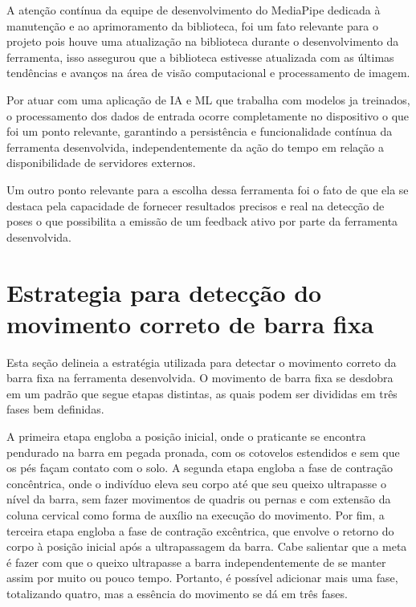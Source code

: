 A atenção contínua da equipe de desenvolvimento do MediaPipe dedicada à manutenção e ao aprimoramento da biblioteca, foi um  fato relevante para o projeto pois houve uma atualização na biblioteca durante o desenvolvimento da ferramenta, isso assegurou que a biblioteca estivesse atualizada com as últimas tendências e avanços na área de visão computacional e processamento de imagem.

Por atuar com uma aplicação de \ac{IA} e \ac{ML} que trabalha com modelos ja treinados, o processamento dos dados de entrada ocorre completamente no dispositivo o que foi um ponto relevante, garantindo a persistência e funcionalidade contínua da ferramenta desenvolvida, independentemente da ação do tempo em relação a disponibilidade de servidores externos.

Um outro ponto relevante para a escolha dessa ferramenta foi o fato de que ela se destaca pela capacidade de fornecer resultados precisos e real na detecção de poses o que possibilita a emissão de um feedback ativo por parte da ferramenta desenvolvida.





\section[Estrategia para detecção do movimento correto de barra fixa]{Estrategia para detecção do movimento correto de barra fixa}\label{sec:Estrategia para deteccao do movimento correto de barra fixa}


Esta seção delineia a estratégia utilizada para detectar o movimento correto da barra fixa na ferramenta desenvolvida. O movimento de barra fixa se desdobra em um padrão que segue etapas distintas, as quais podem ser divididas em três fases bem definidas. 

A primeira etapa engloba a posição inicial, onde o praticante se encontra pendurado na barra em pegada pronada, com os cotovelos estendidos e sem que os pés façam contato com o solo. A segunda etapa engloba a fase de contração concêntrica, onde o indivíduo eleva seu corpo até que seu queixo ultrapasse o nível da barra, sem fazer movimentos de quadris ou pernas e com extensão da coluna cervical como forma de auxílio na execução do movimento. Por fim, a terceira etapa engloba a fase de contração excêntrica, que envolve o retorno do corpo à posição inicial após a ultrapassagem da barra. Cabe salientar que a meta é fazer com que o queixo ultrapasse a barra independentemente de se manter assim por muito ou pouco tempo. Portanto, é possível adicionar mais uma fase, totalizando quatro, mas a essência do movimento se dá em três fases.

